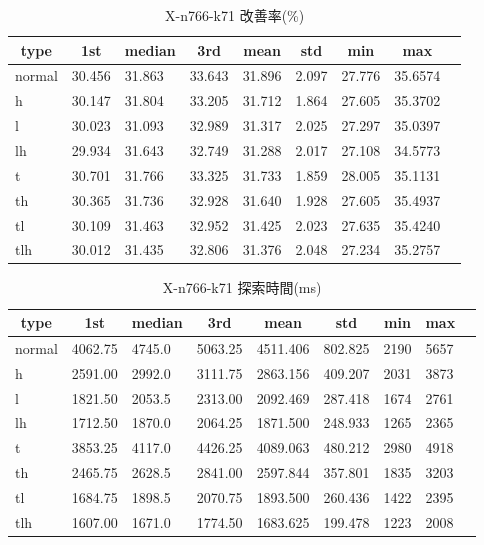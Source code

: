 \begin{table}[htbp]
    \caption{X-n766-k71 改善率(\%)}
    \begin{tabular}{|l|l|l|l|l|l|l|l|l|}\hline
    \multicolumn{1}{|c|}{\textbf{type}}
    &\multicolumn{1}{|c|}{\textbf{1st}}
    &\multicolumn{1}{c|}{\textbf{median}}
    &\multicolumn{1}{c|}{\textbf{3rd}}
    &\multicolumn{1}{c|}{\textbf{mean}}
    &\multicolumn{1}{c|}{\textbf{std}}
    &\multicolumn{1}{c|}{\textbf{min}}
    &\multicolumn{1}{c|}{\textbf{max}}\\\hline
	normal & 30.456 & 31.863 & 33.643 & 31.896 & 2.097 & 27.776 & 35.6574\\\hline
	h & 30.147 & 31.804 & 33.205 & 31.712 & 1.864 & 27.605 & 35.3702\\\hline
	l & 30.023 & 31.093 & 32.989 & 31.317 & 2.025 & 27.297 & 35.0397\\\hline
	lh & 29.934 & 31.643 & 32.749 & 31.288 & 2.017 & 27.108 & 34.5773\\\hline
	t & 30.701 & 31.766 & 33.325 & 31.733 & 1.859 & 28.005 & 35.1131\\\hline
	th & 30.365 & 31.736 & 32.928 & 31.640 & 1.928 & 27.605 & 35.4937\\\hline
	tl & 30.109 & 31.463 & 32.952 & 31.425 & 2.023 & 27.635 & 35.4240\\\hline
	tlh & 30.012 & 31.435 & 32.806 & 31.376 & 2.048 & 27.234 & 35.2757\\\hline
	\end{tabular}
\end{table}
\begin{table}[htbp]
    \caption{X-n766-k71 探索時間(ms)}
    \begin{tabular}{|l|l|l|l|l|l|l|l|l|}\hline
    \multicolumn{1}{|c|}{\textbf{type}}
    &\multicolumn{1}{|c|}{\textbf{1st}}
    &\multicolumn{1}{c|}{\textbf{median}}
    &\multicolumn{1}{c|}{\textbf{3rd}}
    &\multicolumn{1}{c|}{\textbf{mean}}
    &\multicolumn{1}{c|}{\textbf{std}}
    &\multicolumn{1}{c|}{\textbf{min}}
    &\multicolumn{1}{c|}{\textbf{max}}\\\hline
	normal & 4062.75 & 4745.0 & 5063.25 & 4511.406 & 802.825 & 2190 & 5657\\\hline
	h & 2591.00 & 2992.0 & 3111.75 & 2863.156 & 409.207 & 2031 & 3873\\\hline
	l & 1821.50 & 2053.5 & 2313.00 & 2092.469 & 287.418 & 1674 & 2761\\\hline
	lh & 1712.50 & 1870.0 & 2064.25 & 1871.500 & 248.933 & 1265 & 2365\\\hline
	t & 3853.25 & 4117.0 & 4426.25 & 4089.063 & 480.212 & 2980 & 4918\\\hline
	th & 2465.75 & 2628.5 & 2841.00 & 2597.844 & 357.801 & 1835 & 3203\\\hline
	tl & 1684.75 & 1898.5 & 2070.75 & 1893.500 & 260.436 & 1422 & 2395\\\hline
	tlh & 1607.00 & 1671.0 & 1774.50 & 1683.625 & 199.478 & 1223 & 2008\\\hline
	\end{tabular}
\end{table}
